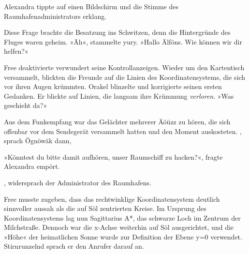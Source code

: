 Alexandra tippte auf einen Bildschirm und die Stimme des Raumhafenadministrators erklang. 

Diese Frage brachte die Besatzung ins Schwitzen, denn die Hintergründe des Fluges waren geheim. »Äh«, stammelte yury. »Hallo Älföns. Wie können wir dir helfen?«


\cleardoubleevenpage



Free deaktivierte verwundert seine Kontrollanzeigen. Wieder um den Kartentisch versammelt, blickten die Freunde auf die Linien des Koordinatensystems, die sich vor ihren Augen krümmten. Orakel blinzelte und korrigierte seinen ersten Gedanken. Er blickte auf Linien, die langsam ihre Krümmung \emph{verloren}. »Was geschieht da?«

Aus dem Funkempfang war das Gelächter mehrerer Äöüzz zu hören, die sich offenbar vor dem Sendegerät versammelt hatten und den Moment auskosteten. , sprach Ögnöwäk dann, 

»Könntest du bitte damit aufhören, unser Raumschiff zu hacken?«, fragte Alexandra empört.

, widersprach der Administrator des Raumhafens. 

Free musste zugeben, dass das rechtwinklige Koordinatensystem deutlich sinnvoller aussah als die auf Söl zentrierten Kreise. Im Ursprung des Koordinatensystems lag nun Sagittarius A*, das schwarze Loch im Zentrum der Milchstraße. Dennoch war die x-Achse weiterhin auf Söl ausgerichtet, und die »Höhe« der heimatlichen Sonne wurde zur Definition der Ebene y=0 verwendet. Stirnrunzelnd sprach er den Anrufer darauf an.



